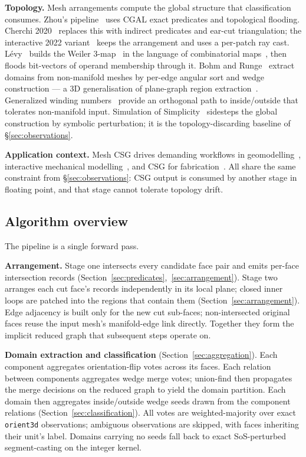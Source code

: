 \documentclass{egpubl}
\begin{document}
\textbf{Topology.} Mesh arrangements compute the global structure that classification consumes. Zhou's pipeline~\cite{Zhou2016} uses CGAL exact predicates and topological flooding. Cherchi 2020~\cite{Cherchi2020} replaces this with indirect predicates and ear-cut triangulation; the interactive 2022 variant~\cite{Cherchi2022} keeps the arrangement and uses a per-patch ray cast. L\'evy~\cite{Levy2025} builds the Weiler 3-map~\cite{Weiler1985} in the language of combinatorial maps~\cite{Lienhardt1988}, then floods bit-vectors of operand membership through it. Bohm and Runge~\cite{BohmRunge2025} extract domains from non-manifold meshes by per-edge angular sort and wedge construction --- a 3D generalisation of plane-graph region extraction~\cite{JiangBunke1993}. Generalized winding numbers~\cite{JacobsonKavanSorkine2013} provide an orthogonal path to inside/outside that tolerates non-manifold input. Simulation of Simplicity~\cite{EdelsbrunnerMucke1990} sidesteps the global construction by symbolic perturbation; it is the topology-discarding baseline of \S\ref{sec:observations}.

\textbf{Application context.} Mesh CSG drives demanding workflows in geomodelling~\cite{Caumon2003,Pellerin2017}, interactive mechanical modelling~\cite{Tymms2016}, and CSG for fabrication~\cite{Garg2016}. All share the same constraint from \S\ref{sec:observations}: CSG output is consumed by another stage in floating point, and that stage cannot tolerate topology drift.

\subsection{Algorithm overview}
\label{sec:overview}

The pipeline is a single forward pass.

\textbf{Arrangement.} Stage one intersects every candidate face pair and emits per-face intersection records (Section~\ref{sec:predicates},~\ref{sec:arrangement}). Stage two arranges each cut face's records independently in its local plane; closed inner loops are patched into the regions that contain them (Section~\ref{sec:arrangement}). Edge adjacency is built only for the new cut sub-faces; non-intersected original faces reuse the input mesh's manifold-edge link directly. Together they form the implicit reduced graph that subsequent steps operate on.

\textbf{Domain extraction and classification} (Section~\ref{sec:aggregation}). Each component aggregates orientation-flip votes across its faces. Each relation between components aggregates wedge merge votes; union-find then propagates the merge decisions on the reduced graph to yield the domain partition. Each domain then aggregates inside/outside wedge seeds drawn from the component relations (Section~\ref{sec:classification}). All votes are weighted-majority over exact \texttt{orient3d} observations; ambiguous observations are skipped, with faces inheriting their unit's label. Domains carrying no seeds fall back to exact SoS-perturbed segment-casting on the integer kernel.
\end{document}
